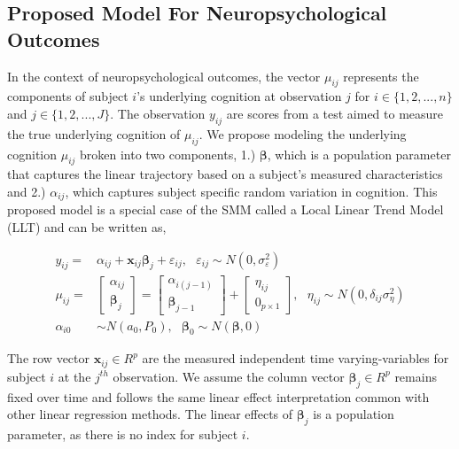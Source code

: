 \documentclass[
]{article}
\begin{document}
\hypertarget{proposed-model-for-neuropsychological-outcomes}{%
\subsection{Proposed Model For Neuropsychological Outcomes}\label{proposed-model-for-neuropsychological-outcomes}}

In the context of neuropsychological outcomes, the vector \(\mu_{ij}\) represents the components of subject \(i\)'s underlying cognition at observation \(j\) for \(i\in \{1, 2, ..., n\}\) and \(j \in \{1, 2, ..., J\}\). The observation \(y_{ij}\) are scores from a test aimed to measure the true underlying cognition of \(\mu_{ij}\). We propose modeling the underlying cognition \(\mu_{ij}\) broken into two components, 1.) \(\boldsymbol{\beta}\), which is a population parameter that captures the linear trajectory based on a subject's measured characteristics and 2.) \(\alpha_{ij}\), which captures subject specific random variation in cognition. This proposed model is a special case of the SMM called a Local Linear Trend Model (LLT) and can be written as,

\begin{equation}
\begin{aligned}\label{PSSM}
y_{ij} =& \alpha_{ij} + \boldsymbol{x}_{ij} \boldsymbol{\beta}_{j}
+ \varepsilon_{ij}, \ \ \  \varepsilon_{ij} \sim N(0, \sigma^2_\varepsilon)\\
\mu_{ij} =&
\begin{bmatrix}
\alpha_{ij} \\
\boldsymbol{\beta}_{j}
\end{bmatrix} = 
\begin{bmatrix}
\alpha_{i(j-1)} \\
\boldsymbol{\beta}_{j-1} 
\end{bmatrix}+ 
\begin{bmatrix}
\eta_{ij} \\
0_{p\times1}
\end{bmatrix},\ \ \ \eta_{ij} \sim N(0, \delta_{ij}\sigma^2_\eta)\\ \alpha_{i0}& \sim N(a_0, P_0),\ \  \ \boldsymbol{\beta}_0 \sim N(\boldsymbol{\beta}, 0)
\end{aligned}
\end{equation}

The row vector \(\boldsymbol{x}_{ij}\in R^{p}\) are the measured independent time varying-variables for subject \(i\) at the \(j^{th}\) observation. We assume the column vector \(\boldsymbol{\beta}_j \in R^p\) remains fixed over time and follows the same linear effect interpretation common with other linear regression methods. The linear effects of \(\boldsymbol{\beta}_j\) is a population parameter, as there is no index for subject \(i\).
\end{document}
